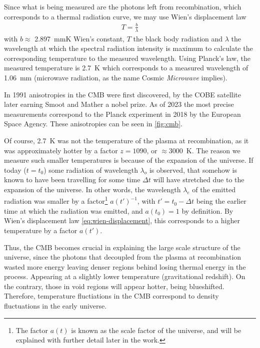 Since what is being measured are the photons left from recombination, which corresponds to a thermal radiation curve, we may use Wien's displacement law 
\begin{align}
	T = \frac{b}{\lambda}
	\label{eq:wien-displacement}
\end{align}
with $b\approx $ \SI{2.897}{mmK} Wien's constant, $T$ the black body radiation and $\lambda$ the wavelength at which the spectral radiation intensity is maximum to calculate the corresponding temperature to the measured wavelength. Using Planck's law, the measured temperature is \SI{2.7}{K} which corresponds to a measured wavelength of \SI{1.06}{mm} (microwave radiation, as the name Cosmic \textit{Microwave} implies).

In 1991 anisotropies in the CMB were first discovered, by the COBE satellite\cite{SmootMather} later earning Smoot and Mather a nobel prize. As of 2023 the most precise measurements correspond to the Planck experiment in 2018 \cite{Planck2018} by the European Space Agency. These anisotropies can be seen in \ref{fig:cmb}.

Of course, \SI{2.7}{K} was not the temperature of the plasma at recombination, as it was approximately hotter by a factor $z=1090$, or $\approx$\SI{3000}{K}. The reason we measure such smaller temperatures is because of the expansion of the universe.
If today ($t=t_0$) some radiation of wavelength $\lambda_o$ is observed, that somehow is known to have been travelling for some time $\Delta t$ will have stretched due to the expansion of the universe. In other words, the wavelength $\lambda_e$ of the emitted radiation was smaller by a factor\footnote{The factor $a(t)$ is known as the scale factor of the universe, and will be explained with further detail later in the work.} $a(t')^{-1}$, with $t' = t_0-\Delta t$ being the earlier time at which the radiation was emitted, and $a(t_0)=1$ by definition. By Wien's displacement law \eqref{eq:wien-displacement}, this corresponds to a higher temperature by a factor $a(t')$.


Thus, the CMB becomes crucial in explaining the large scale structure of the universe, since the photons that decoupled from the plasma at recombination wasted more energy leaving denser regions behind losing thermal energy in the process. Appearing at a slightly lower temperature (gravitational redshift). On the contrary, those in void regions will appear hotter, being blueshifted. Therefore, temperature fluctiations in the CMB correspond to density fluctuations in the early universe.


